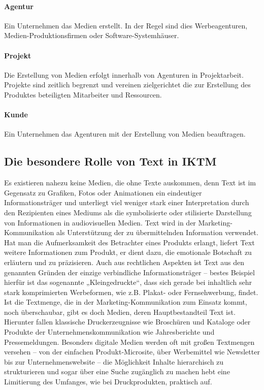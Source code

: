 \paragraph{Agentur} Ein Unternehmen das Medien erstellt. In der Regel sind dies Werbeagenturen, Medien-Produktionsfirmen oder Software-Systemhäuser. 

\paragraph{Projekt} Die Erstellung von Medien erfolgt innerhalb von Agenturen in Projektarbeit. Projekte sind zeitlich begrenzt und vereinen zielgerichtet die zur Erstellung des Produktes beteiligten Mitarbeiter und Ressourcen. 

\paragraph{Kunde} Ein Unternehmen das Agenturen mit der Erstellung von Medien beauftragen.

\subsection{Die besondere Rolle von Text in \acl{IKTM}}

Es existieren nahezu keine Medien, die ohne Texte auskommen, denn Text ist im Gegensatz zu Grafiken, Fotos oder Animationen ein eindeutiger Informationsträger und unterliegt viel weniger stark einer Interpretation durch den Rezipienten eines Mediums als die symbolisierte oder stilisierte Darstellung von Informationen in audiovisuellen Medien. Text wird in der Marketing-Kommunikation als Unterstützung der zu übermittelnden Information verwendet. Hat man die Aufmerksamkeit des Betrachter eines Produkts erlangt, liefert Text weitere Informationen zum Produkt, er dient dazu, die emotionale Botschaft zu erläutern und zu präzisieren. Auch aus rechtlichen Aspekten ist Text aus den genannten Gründen der einzige verbindliche Informationsträger – bestes Beispiel hierfür ist das sogenannte „Kleingedruckte“, dass sich gerade bei inhaltlich sehr stark komprimierten Werbeformen, wie z.B. Plakat- oder Fernsehwerbung, findet. Ist die Textmenge, die in der Marketing-Kommunikation zum Einsatz kommt, noch überschaubar, gibt es doch Medien, deren Hauptbestandteil Text ist. Hierunter fallen klassische Druckerzeugnisse wie Broschüren und Kataloge oder Produkte der Unternehmenskommunikation wie Jahresberichte und Pressemeldungen. Besonders digitale Medien werden oft mit großen Textmengen versehen – von der einfachen Produkt-Microsite, über Werbemittel wie Newsletter bis zur Unternehmenswebsite – die Möglichkeit Inhalte hierarchisch zu strukturieren und sogar über eine Suche zugänglich zu machen hebt eine Limitierung des Umfanges, wie bei Druckprodukten, praktisch auf.

